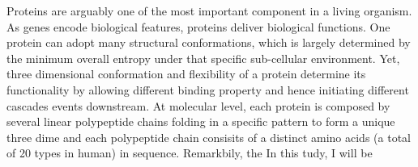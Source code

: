 Proteins are arguably one of the most important component in a living organism. As genes encode biological features, proteins deliver biological functions. One protein can adopt many structural conformations, which is largely determined by the minimum overall entropy under that specific sub-cellular environment. Yet, three dimensional conformation and flexibility of a protein determine its functionality by allowing different binding property and hence initiating different cascades events downstream. At molecular level, each protein is composed by several linear polypeptide chains folding in a specific pattern to form a unique three dime and each polypeptide chain consisits of a distinct amino acids (a total of 20 types in human) in sequence. Remarkbily, the  In this tudy, I will be 